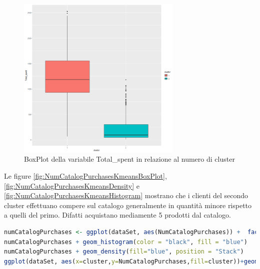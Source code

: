 \documentclass[letterpaper,11pt]{article}
\begin{document}
\begin{figure}[H]
    \centering
    \includegraphics[width=0.7\textwidth]{Img/K-MEANS/KMEANS015.png}
    \caption{BoxPlot della variabile Total\_spent in relazione al numero di cluster}
    \label{fig:TotalSpentKmeansBoxPlot}
\end{figure}

Le figure \ref{fig:NumCatalogPurchasesKmeansBoxPlot}, \ref{fig:NumCatalogPurchasesKmeansDensity} e \ref{fig:NumCatalogPurchasesKmeansHistogram} mostrano che i clienti del secondo cluster effettuano compere sul catalogo generalmente in quantità minore rispetto a quelli del primo. Difatti acquistano mediamente 5 prodotti dal catalogo.
\begin{lstlisting}[language=R]
numCatalogPurchases <- ggplot(dataSet, aes(NumCatalogPurchases)) +  facet_grid(cluster~.)
numCatalogPurchases + geom_histogram(color = "black", fill = "blue") 
numCatalogPurchases + geom_density(fill="blue", position = "Stack")
ggplot(dataSet, aes(x=cluster,y=NumCatalogPurchases,fill=cluster))+geom_boxplot(outlier.colour="black") + ylim(0,10)
\end{lstlisting}
\end{document}
